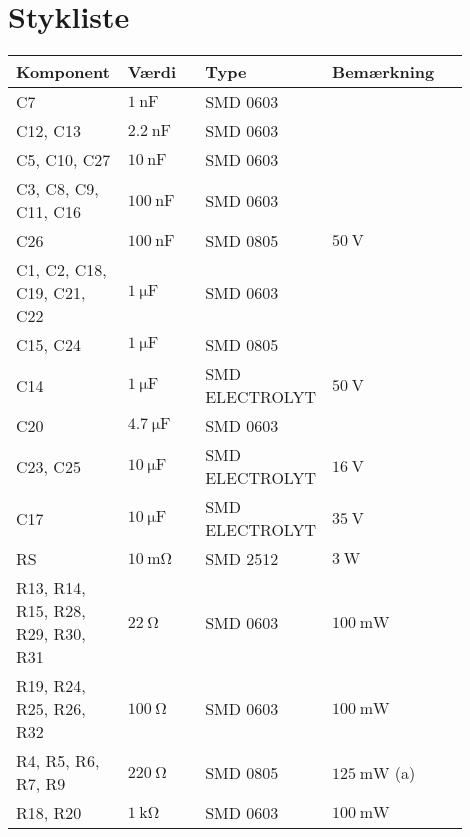 \chapter{Stykliste} \label{bilag:styklister}
\begin{table}[h!]
	\small
	\label{tab:stykliste_ic}
	\begin{threeparttable}
		\begin{tabular}{p{0.25\linewidth}p{0.2\linewidth}p{0.25\linewidth}p{0.15\linewidth}p{0.05\linewidth}}
			\toprule
			\multicolumn{1}{l}{\textbf{Komponent}}  &
			\multicolumn{1}{l}{\textbf{Værdi}}      &
			\multicolumn{1}{l}{\textbf{Type}}       &
			\multicolumn{1}{l}{\textbf{Bemærkning}} &  \\ 
			\hline
			C7                   & $\SI{1}{\nano\farad}$   & SMD 0603 &   \\
			C12, C13             & $\SI{2.2}{\nano\farad}$   & SMD 0603 &   \\
			C5, C10, C27         & $\SI{10}{\nano\farad}$  & SMD 0603 &   \\
			C3, C8, C9, C11, C16 & $\SI{100}{\nano\farad}$ & SMD 0603  &   \\
			C26                  & $\SI{100}{\nano\farad}$ & SMD 0805 &  $\SI{50}{\volt}$  \\
			C1, C2, C18, C19, C21, C22 & $\SI{1}{\micro\farad}$  & SMD 0603 &   \\
			C15, C24 & $\SI{1}{\micro\farad}$  & SMD 0805 &   \\
			C14 & $\SI{1}{\micro\farad}$  & SMD ELECTROLYT  & $\SI{50}{\volt}$  \\
			C20 & $\SI{4.7}{\micro\farad}$ & SMD 0603 &   \\
			C23, C25 & $\SI{10}{\micro\farad}$  & SMD ELECTROLYT  & $\SI{16}{\volt}$  \\
			C17 & $\SI{10}{\micro\farad}$  & SMD ELECTROLYT  & $\SI{35}{\volt}$  \\
			\midrule
			RS & $\SI{10}{\milli\ohm}$ & SMD 2512 &  $\SI{3}{\watt}$    \\
			R13, R14, R15, R28, R29, R30, R31& $\SI{22}{\ohm}$  & SMD 0603 &  $\SI{100}{\milli\watt}$ \\
			R19, R24, R25, R26, R32 & $\SI{100}{\ohm}$ & SMD 0603 & $\SI{100}{\milli\watt}$  \\
			R4, R5, R6, R7, R9 & $\SI{220}{\ohm}$ & SMD 0805 & $\SI{125}{\milli\watt}$ (a) \\
			R18, R20 & $\SI{1}{\kilo\ohm}$ & SMD 0603 & $\SI{100}{\milli\watt}$  \\

\end{tabular}
\end{threeparttable}
\end{table}
